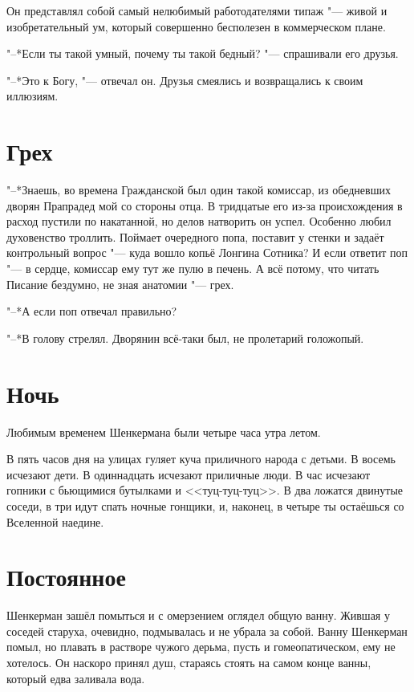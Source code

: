 Он представлял собой самый нелюбимый работодателями типаж "--- живой и изобретательный ум, который совершенно бесполезен в коммерческом плане.

"--*Если ты такой умный, почему ты такой бедный? "--- спрашивали его друзья.

"--*Это к Богу, "--- отвечал он.
Друзья смеялись и возвращались к своим иллюзиям.

\section{Грех}

"--*Знаешь, во времена Гражданской был один такой комиссар, из обедневших дворян\ldotst
Прапрадед мой со стороны отца.
В тридцатые его из-за происхождения в расход пустили по накатанной, но делов натворить он успел.
Особенно любил духовенство троллить.
Поймает очередного попа, поставит у стенки и задаёт контрольный вопрос "--- куда вошло копьё Лонгина Сотника?
И если ответит поп "--- в сердце, комиссар ему тут же пулю в печень.
А всё потому, что читать Писание бездумно, не зная анатомии "--- грех.

"--*А если поп отвечал правильно?

"--*В голову стрелял.
Дворянин всё-таки был, не пролетарий голожопый.

\section{Ночь}

Любимым временем Шенкермана были четыре часа утра летом.

В пять часов дня на улицах гуляет куча приличного народа с детьми.
В восемь исчезают дети.
В одиннадцать исчезают приличные люди.
В час исчезают гопники с бьющимися бутылками и <<туц-туц-туц>>.
В два ложатся двинутые соседи, в три идут спать ночные гонщики, и, наконец, в четыре ты остаёшься со Вселенной наедине.

\section{Постоянное}

Шенкерман зашёл помыться и с омерзением оглядел общую ванну.
Жившая у соседей старуха, очевидно, подмывалась и не убрала за собой.
Ванну Шенкерман помыл, но плавать в растворе чужого дерьма, пусть и гомеопатическом, ему не хотелось.
Он наскоро принял душ, стараясь стоять на самом конце ванны, который едва заливала вода.

